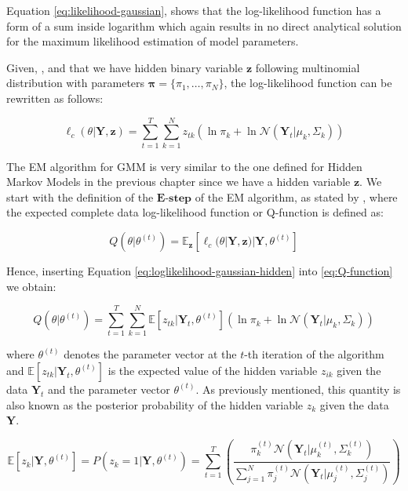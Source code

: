 Equation \ref{eq:likelihood-gaussian}, shows that the log-likelihood function has a form of a sum inside logarithm which again results in no direct analytical solution for the maximum likelihood estimation of model parameters.

Given, \citep{Pandolfi2021}, and that we have hidden binary variable $\textbf{z}$ following multinomial distribution with parameters $\boldsymbol{\pi} = \{\pi_1,\ldots,\pi_N\}$, the log-likelihood function can be rewritten as follows:

\begin{equation} \label{eq:loglikelihood-gaussian-hidden}
    \ell_c(\theta|\textbf{Y},\textbf{z}) = \sum_{t=1}^{T} \sum_{k=1}^{N} z_{tk} \left(\ln \pi_k + \ln \mathcal{N}(\textbf{Y}_t|\mu_k,\Sigma_k)\right)
\end{equation}

The EM algorithm for GMM is very similar to the one defined for Hidden Markov Models in the previous chapter since we have a hidden variable $\textbf{z}$. 
We start with the definition of the $\textbf{E-step}$ of the EM algorithm, as stated by \citep{Sahu2020}, where the expected complete 
data log-likelihood function or Q-function is defined as:

\begin{equation} \label{eq:Q-function} 
    Q(\theta|\theta^{(t)}) = \mathbb{E}_{\textbf{z}}[\ell_c(\theta|\textbf{Y},\textbf{z})|\textbf{Y},\theta^{(t)}]
\end{equation}

\noindent Hence, inserting Equation \ref{eq:loglikelihood-gaussian-hidden} into \ref*{eq:Q-function} we obtain:

\begin{equation}
    Q(\theta|\theta^{(t)}) = \sum_{t=1}^{T} \sum_{k=1}^{N} \mathbb{E}[z_{tk}|\textbf{Y}_t,\theta^{(t)}] \left(\ln \pi_k + \ln \mathcal{N}(\textbf{Y}_t|\mu_k,\Sigma_k)\right)
\end{equation}

where $\theta^{(t)}$ denotes the parameter vector at the $t$-th iteration of the algorithm and $\mathbb{E}[z_{tk}|\textbf{Y}_t,\theta^{(t)}]$ is the expected value of the hidden variable $z_{ik}$ given the data $\textbf{Y}_t$ and the parameter vector $\theta^{(t)}$. As previously mentioned, this quantity is also known as the posterior probability of the hidden variable $z_{k}$ given the data $\textbf{Y}$.

\begin{equation} \label{eq:posterior_prob}
    \mathbb{E}[z_{k}|\textbf{Y},\theta^{(t)}] = P(z_{k} = 1|\textbf{Y},\theta^{(t)}) = \sum_{t=1}^{T} \left( \frac{\pi_k^{(t)} \mathcal{N}(\textbf{Y}_t|\mu_k^{(t)},\Sigma_k^{(t)})}{\sum_{j=1}^{N} \pi_j^{(t)} \mathcal{N}(\textbf{Y}_t|\mu_j^{(t)},\Sigma_j^{(t)})} \right)
\end{equation}

